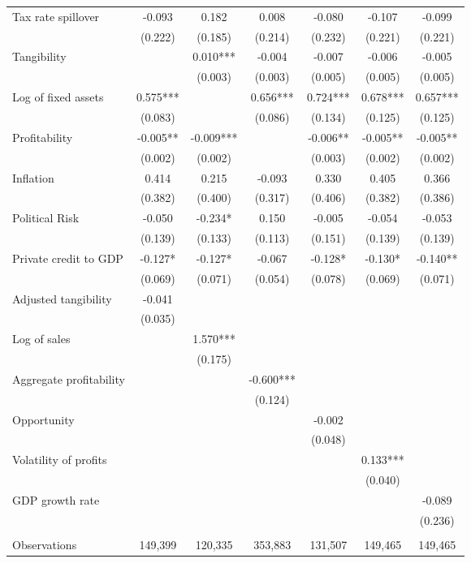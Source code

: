 \begin{tabular}{lcccccc}
Tax rate spillover & -0.093 & 0.182 & 0.008 & -0.080 & -0.107 & -0.099 \\
 & (0.222) & (0.185) & (0.214) & (0.232) & (0.221) & (0.221) \\
Tangibility &  & 0.010*** & -0.004 & -0.007 & -0.006 & -0.005 \\
 &  & (0.003) & (0.003) & (0.005) & (0.005) & (0.005) \\
Log of fixed assets & 0.575*** &  & 0.656*** & 0.724*** & 0.678*** & 0.657*** \\
 & (0.083) &  & (0.086) & (0.134) & (0.125) & (0.125) \\
Profitability & -0.005** & -0.009*** &  & -0.006** & -0.005** & -0.005** \\
 & (0.002) & (0.002) &  & (0.003) & (0.002) & (0.002) \\
Inflation & 0.414 & 0.215 & -0.093 & 0.330 & 0.405 & 0.366 \\
 & (0.382) & (0.400) & (0.317) & (0.406) & (0.382) & (0.386) \\
Political Risk & -0.050 & -0.234* & 0.150 & -0.005 & -0.054 & -0.053 \\
 & (0.139) & (0.133) & (0.113) & (0.151) & (0.139) & (0.139) \\
Private credit to GDP & -0.127* & -0.127* & -0.067 & -0.128* & -0.130* & -0.140** \\
 & (0.069) & (0.071) & (0.054) & (0.078) & (0.069) & (0.071) \\
Adjusted tangibility & -0.041 &  &  &  &  &  \\
 & (0.035) &  &  &  &  &  \\
Log of sales &  & 1.570*** &  &  &  &  \\
 &  & (0.175) &  &  &  &  \\
Aggregate profitability &  &  & -0.600*** &  &  &  \\
 &  &  & (0.124) &  &  &  \\
Opportunity &  &  &  & -0.002 &  &  \\
 &  &  &  & (0.048) &  &  \\
Volatility of profits &  &  &  &  & 0.133*** &  \\
 &  &  &  &  & (0.040) &  \\
GDP growth rate &  &  &  &  &  & -0.089 \\
 &  &  &  &  &  & (0.236) \\
 &  &  &  &  &  &  \\
Observations & 149,399 & 120,335 & 353,883 & 131,507 & 149,465 & 149,465 \\

\end{tabular}
